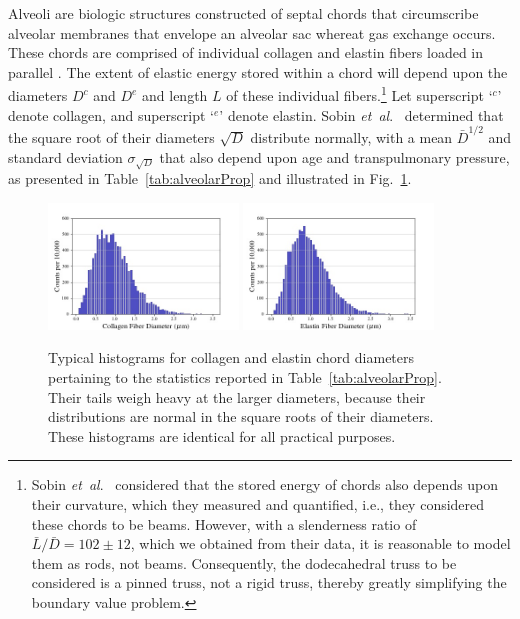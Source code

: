 Alveoli are biologic structures constructed of septal chords that circumscribe alveolar membranes that envelope an alveolar sac whereat gas exchange occurs.  These chords are comprised of individual collagen and elastin fibers loaded in parallel \cite{Matsudaetal87,Sobinetal88}.  The extent of elastic energy stored within a chord will depend upon the diameters $D^c$ and $D^e$ and length $L$ of these individual fibers.\footnote{
	Sobin \textit{et~al}.\ \cite{Sobinetal88} considered that the stored energy of chords also depends upon their curvature, which they measured and quantified, i.e., they considered these chords to be beams.  However, with a slenderness ratio of $\bar{L}/\bar{D} = 102 \pm 12$, which we obtained from their data, it is reasonable to model them as rods, not beams.  Consequently, the dodecahedral truss to be considered is a pinned truss, not a rigid truss, thereby greatly simplifying the boundary value problem.
}
Let superscript `$\mbox{}^c$' denote collagen, and superscript `$\mbox{}^e$' denote elastin.  Sobin \textit{et~al}.\ \cite{Sobinetal88} determined that the square root of their diameters $\sqrt{D}$ distribute normally, with a mean $\bar{D}^{1/2}$ and standard deviation $\sigma_{\sqrt{D}}$ that also depend upon age and transpulmonary pressure, as presented in Table~\ref{tab:alveolarProp} and illustrated in Fig.~\ref{fig:septalChordStats}. 

\begin{figure}
    \centering
    \includegraphics[width=0.45\textwidth]{figures/collagenFiberDiaHistogram.jpg}
    \includegraphics[width=0.45\textwidth]{figures/elastinFiberDiaHistogram.jpg}
    \caption{Typical histograms for collagen and elastin chord diameters pertaining to the statistics reported in Table~\ref{tab:alveolarProp}.  Their tails weigh heavy at the larger diameters, because their distributions are normal in the square roots of their diameters.  These histograms are identical for all practical purposes.}
    \label{fig:septalChordStats}
\end{figure}

